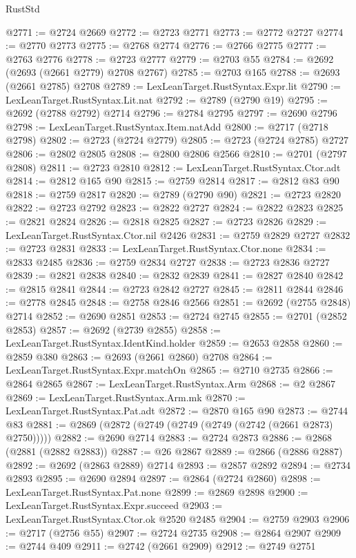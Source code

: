 \begin{lexlean}{RustStd}
\begin{coremodule}
@2771 := @2724 @2669
@2772 := @2723 @2771
@2773 := @2772 @2727
@2774 := @2770 @2773
@2775 := @2768 @2774
@2776 := @2766 @2775
@2777 := @2763 @2776
@2778 := @2723 @2777
@2779 := @2703 @55
@2784 := @2692 (@2693 (@2661 @2779) @2708 @2767)
@2785 := @2703 @165
@2788 := @2693 (@2661 @2785) @2708
@2789 := LexLeanTarget.RustSyntax.Expr.lit
@2790 := LexLeanTarget.RustSyntax.Lit.nat
@2792 := @2789 (@2790 @19)
@2795 := @2692 (@2788 @2792) @2714
@2796 := @2784 @2795
@2797 := @2690 @2796
@2798 := LexLeanTarget.RustSyntax.Item.natAdd
@2800 := @2717 (@2718 @2798)
@2802 := @2723 (@2724 @2779)
@2805 := @2723 (@2724 @2785) @2727
@2806 := @2802 @2805
@2808 := @2800 @2806 @2566
@2810 := @2701 (@2797 @2808)
@2811 := @2723 @2810
@2812 := LexLeanTarget.RustSyntax.Ctor.adt
@2814 := @2812 @165 @90
@2815 := @2759 @2814
@2817 := @2812 @83 @90
@2818 := @2759 @2817
@2820 := @2789 (@2790 @90)
@2821 := @2723 @2820
@2822 := @2723 @2792
@2823 := @2822 @2727
@2824 := @2822 @2823
@2825 := @2821 @2824
@2826 := @2818 @2825
@2827 := @2723 @2826
@2829 := LexLeanTarget.RustSyntax.Ctor.nil @2426
@2831 := @2759 @2829 @2727
@2832 := @2723 @2831
@2833 := LexLeanTarget.RustSyntax.Ctor.none
@2834 := @2833 @2485
@2836 := @2759 @2834 @2727
@2838 := @2723 @2836 @2727
@2839 := @2821 @2838
@2840 := @2832 @2839
@2841 := @2827 @2840
@2842 := @2815 @2841
@2844 := @2723 @2842 @2727
@2845 := @2811 @2844
@2846 := @2778 @2845
@2848 := @2758 @2846 @2566
@2851 := @2692 (@2755 @2848) @2714
@2852 := @2690 @2851
@2853 := @2724 @2745
@2855 := @2701 (@2852 @2853)
@2857 := @2692 (@2739 @2855)
@2858 := LexLeanTarget.RustSyntax.IdentKind.holder
@2859 := @2653 @2858
@2860 := @2859 @380
@2863 := @2693 (@2661 @2860) @2708
@2864 := LexLeanTarget.RustSyntax.Expr.matchOn
@2865 := @2710 @2735
@2866 := @2864 @2865
@2867 := LexLeanTarget.RustSyntax.Arm
@2868 := @2 @2867
@2869 := LexLeanTarget.RustSyntax.Arm.mk
@2870 := LexLeanTarget.RustSyntax.Pat.adt
@2872 := @2870 @165 @90
@2873 := @2744 @83
@2881 := @2869 (@2872 (@2749 (@2749 (@2749 (@2742 (@2661 @2873) @2750)))))
@2882 := @2690 @2714
@2883 := @2724 @2873
@2886 := @2868 (@2881 (@2882 @2883))
@2887 := @26 @2867
@2889 := @2866 (@2886 @2887)
@2892 := @2692 (@2863 @2889) @2714
@2893 := @2857 @2892
@2894 := @2734 @2893
@2895 := @2690 @2894
@2897 := @2864 (@2724 @2860)
@2898 := LexLeanTarget.RustSyntax.Pat.none
@2899 := @2869 @2898
@2900 := LexLeanTarget.RustSyntax.Expr.succeed
@2903 := LexLeanTarget.RustSyntax.Ctor.ok @2520 @2485
@2904 := @2759 @2903
@2906 := @2717 (@2756 @55)
@2907 := @2724 @2735
@2908 := @2864 @2907
@2909 := @2744 @409
@2911 := @2742 (@2661 @2909)
@2912 := @2749 @2751

\end{coremodule}
\end{lexlean}
